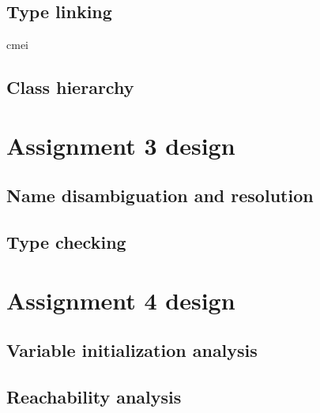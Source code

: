 \documentclass[12pt]{article}
\begin{document}
\subsection{Type linking}
cmei

\subsection{Class hierarchy}

\section{Assignment 3 design}

\subsection{Name disambiguation and resolution}

\subsection{Type checking}


\section{Assignment 4 design}

\subsection{Variable initialization analysis}

\subsection{Reachability analysis}
\end{document}

